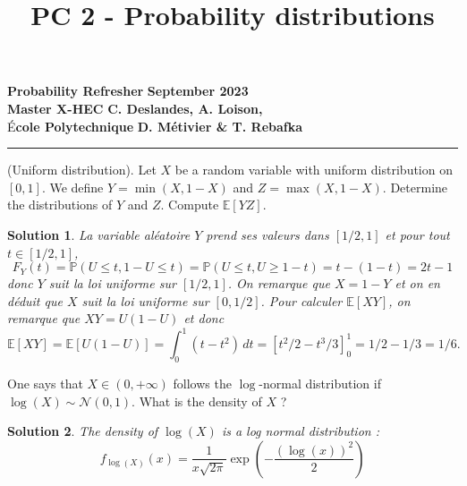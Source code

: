 \documentclass{article}
\title{PC 2 - Probability distributions}
\author{}
\date{}
\newtheorem{solution}{Solution}
\begin{document}
\begin{flushleft}
  \textbf{Probability Refresher} \hfill \textbf{September 2023} \\
  \textbf{Master X-HEC} \hfill \textbf{C. Deslandes, A. Loison,} \\
  É\textbf{cole Polytechnique} \hfill \textbf{D. Métivier \& T. Rebafka}
\end{flushleft}

{\let\newpage\relax\maketitle}
\vspace{-1.3cm}
\hrule

\vspace{0.5cm}

\begin{Exercise} (Uniform distribution). Let $X$ be a random variable with uniform distribution on $[0,1]$. We define $Y=\min (X, 1-X)$ and $Z=\max (X, 1-X)$. Determine the distributions of $Y$ and $Z$. Compute $\mathbb{E}[Y Z]$.
\end{Exercise}

\begin{solution}
  La variable al\'{e}atoire $Y$ prend ses valeurs dans $[1/2,1]$ et pour tout $t\in[1/2,1]$,
  \[
    F_Y(t) = \mathbb{P}(U\leq t,1-U\leq t) = \mathbb{P}(U\leq t,U\geq 1-t)
    = t - (1-t) = 2t-1
  \]
  donc $Y$ suit la loi uniforme sur $[1/2,1]$. On remarque que $X = 1-Y$ et on en
  d\'{e}duit que $X$ suit la loi uniforme sur $[0,1/2]$. Pour calculer
  $\mathbb{E}[XY]$, on remarque que $XY = U(1-U)$ et donc
  \[
    \mathbb{E}[XY]
    = \mathbb{E}[U(1-U)]
    = \int_0^{1}\!(t-t^2)\,dt
      = [t^2/2-t^3/3]_0^{1}
    = 1/2-1/3=1/6.
  \]
\end{solution}

\begin{Exercise}
  One says that $X \in (0,+\infty)$ follows the $\log$-normal distribution if $\log (X) \sim \mathcal{N}(0,1)$. What is the density of $X$ ?
\end{Exercise}

\begin{solution}
  The density of $\log (X)$ is a log normal distribution :
  $$f_{\log (X)}(x) = \frac{1}{x\sqrt{2\pi}} \exp{\left( -\frac{(\log(x))^2}{2} \right)}$$
\end{solution}
\end{document}
